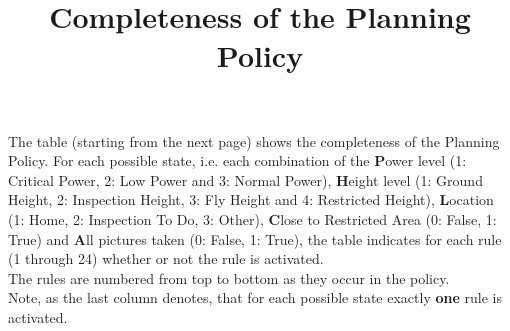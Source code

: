 \documentclass[12pt]{extarticle}
\begin{document}
\title{Completeness of the Planning Policy}
\date{}
\author{}
\maketitle
\noindent
The table (starting from the next page) shows the completeness of the Planning Policy. For each possible state, i.e. each combination of the \textbf{P}ower level (1: Critical Power, 2: Low Power and 3: Normal Power), \textbf{H}eight level (1: Ground Height, 2: Inspection Height, 3: Fly Height and 4: Restricted Height), \textbf{L}ocation (1: Home, 2: Inspection To Do, 3: Other), \textbf{C}lose to Restricted Area (0: False, 1: True) and \textbf{A}ll pictures taken (0: False, 1: True), the table indicates for each rule (1 through 24) whether or not the rule is activated.\\
The rules are numbered from top to bottom as they occur in the policy.\\
Note, as the last column denotes, that for each possible state exactly \textbf{one} rule is activated.
\end{document}

